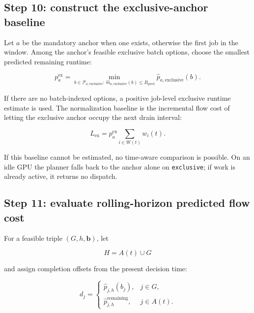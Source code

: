 \documentclass[11pt]{article}
\newcommand{\code}[1]{\textcolor{codeblue}{\texttt{#1}}}
\begin{document}
\subsection{Step 10: construct the exclusive-anchor baseline}

Let $a$ be the mandatory anchor when one exists, otherwise the first job in the
window.  Among the anchor's feasible exclusive batch options, choose the
smallest predicted remaining runtime:

\begin{equation}
  p_a^{\mathrm{ex}}
  =\min_{b\in\mathcal P_{a,\mathrm{exclusive}}:\,
          \widehat m_{a,\mathrm{exclusive}}(b)\le B_{\mathrm{pred}}}
    \widehat p_{a,\mathrm{exclusive}}(b).
  \label{eq:exclusive-anchor-duration}
\end{equation}

If there are no batch-indexed options, a positive job-level exclusive runtime
estimate is used.  The normalization baseline is the incremental flow cost of
letting the exclusive anchor occupy the next drain interval:

\begin{equation}
  L_{\mathrm{ex}}
  =p_a^{\mathrm{ex}}\sum_{i\in W(t)}w_i(t).
  \label{eq:exclusive-baseline}
\end{equation}

If this baseline cannot be estimated, no time-aware comparison is possible.  On
an idle GPU the planner falls back to the anchor alone on \code{exclusive}; if
work is already active, it returns no dispatch.

\subsection{Step 11: evaluate rolling-horizon predicted flow cost}

For a feasible triple $(G,h,\boldsymbol b)$, let

\begin{equation}
  H=A(t)\cup G
\end{equation}

and assign completion offsets from the present decision time:

\begin{equation}
  d_j=
  \begin{cases}
    \widehat p_{j,h}(b_j), & j\in G,\\
    \widehat p^{\mathrm{remaining}}_{j,h}, & j\in A(t).
  \end{cases}
  \label{eq:completion-offsets}
\end{equation}
\end{document}
